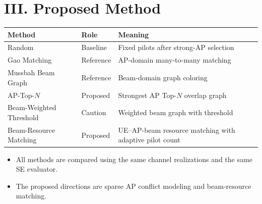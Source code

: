 \documentclass[aspectratio=169, 10pt]{beamer}
\newcommand{\methodBRM}{Beam-Resource Matching}
\newcommand{\methodTopN}{AP-Top-\(N\)}
\begin{document}
\section{III. Proposed Method}
\OnlyTitle
\begin{frame}{\insertsectionhead}
    \scriptsize
    \begin{tabular}{p{}p{}p{}}
        \toprule
        Method & Role & Meaning \\
        \midrule
        Random & Baseline & Fixed pilots after strong-AP selection \\
        Gao Matching & Reference & AP-domain many-to-many matching \\
        Mussbah Beam Graph & Reference & Beam-domain graph coloring \\
        \methodTopN{} & Proposed & Strongest AP Top-\(N\) overlap graph \\
        Beam-Weighted Threshold & Caution & Weighted beam graph with threshold \\
        \methodBRM{} & Proposed & UE--AP-beam resource matching with adaptive pilot count \\
        \bottomrule
    \end{tabular}

    \vspace{0.3cm}
    \begin{itemize}
        \item All methods are compared using the same channel realizations and the same SE evaluator.
        \item The proposed directions are sparse AP conflict modeling and beam-resource matching.
    \end{itemize}
\end{frame}
\end{document}

